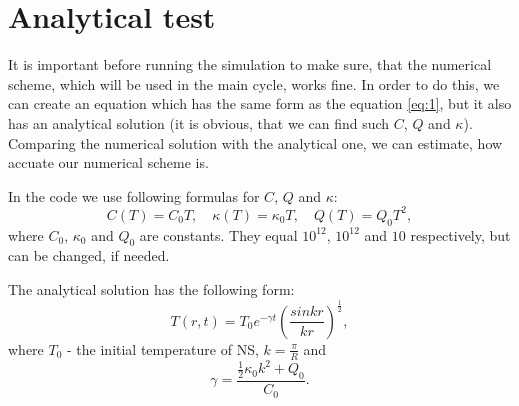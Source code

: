 \documentclass[preprint,pre,floats,aps,amsmath,amssymb]{revtex4}
\begin{document}
 \section{Analytical test} \label{Analytical test}
 \par It is important before running the simulation to make sure, that the numerical scheme, which will be used in the main cycle, works fine. In order to do this, we can create an equation which has the same form as the equation \ref{eq:1}, but it also has an analytical solution (it is obvious, that we can find such $C$, $Q$ and $\kappa$). Comparing the numerical solution with the analytical one, we can estimate, how accuate our numerical scheme is.
 \par In the code we use following formulas for $C$, $Q$ and $\kappa$:
 \begin{equation*}
C(T) = C_{0}T, \quad \kappa(T) = \kappa_{0}T, \quad Q(T) = Q_{0}T^{2},
\end{equation*}
where $C_{0}$, $\kappa_{0}$ and $Q_{0}$ are constants. They equal $10^{12}$, $10^{12}$ and $10$ respectively, but can be changed, if needed.
\par The analytical solution has the following form:
 \begin{equation*}
T(r,t) = T_{0}e^{-\gamma t}\left(\frac{sin kr}{kr}\right)^{\frac{1}{2}},
\end{equation*}
where $T_{0}$ - the initial temperature of NS, $k = \frac{\pi}{R}$ and
\begin{equation*}
\gamma = \frac{\frac{1}{2}\kappa_{0}k^{2} + Q_{0}}{C_{0}}.
\end{equation*}
\end{document}
